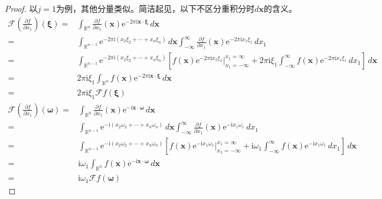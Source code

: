 \begin{proof}
    以$j=1$为例，其他分量类似。简洁起见，以下不区分重积分时$d\mathbf{x}$的含义。
    {\color{blue}\begin{align*}
    \mathcal{F} \left(\frac{\partial f}{\partial x_1}\right)(\boldsymbol{\xi})=&\int_{\mathbb{R}^n}\frac{\partial f}{\partial x_1}(\mathbf{x})\mathrm{e}^{-2\pi \mathrm{i} \mathbf{x}\cdot\boldsymbol{\xi}}\,d\mathbf{x}\\
    =&\int_{\mathbb{R}^{n-1}}\mathrm{e}^{-2\pi \mathrm{i} (x_2\xi_2+\cdots +x_n\xi_n)}\,d\mathbf{x}\int_{-\infty}^{\infty}\frac{\partial f}{\partial x_1}(\mathbf{x})\mathrm{e}^{-2\pi \mathrm{i} x_1 \xi_1}\,dx_1\\
    =&\int_{\mathbb{R}^{n-1}}\mathrm{e}^{-2\pi \mathrm{i} (x_2\xi_2+\cdots +x_n\xi_n)}\left[f(\mathbf{x})\mathrm{e}^{-2\pi \mathrm{i} x_1 \xi_1}\Big|_{x_1=-\infty}^{x_1=\infty}+2\pi \mathrm{i} \xi_1 \int_{-\infty}^{\infty}f(\mathbf{x})\mathrm{e}^{-2\pi \mathrm{i} x_1 \xi_1}\,dx_1\right]\,d\mathbf{x}\\
    =&2\pi \mathrm{i} \xi_1 \int_{\mathbb{R}^n}f(\mathbf{x})\mathrm{e}^{-2\pi \mathrm{i} \mathbf{x}\cdot\boldsymbol{\xi}}\,d\mathbf{x}\\
    =&2\pi \mathrm{i} \xi_1 \mathcal{F} f(\boldsymbol{\xi})
    \end{align*}}
    {\color{red}
    \begin{align*}
    \mathcal{F} \left(\frac{\partial f}{\partial x_1}\right)(\boldsymbol{\omega})=&\int_{\mathbb{R}^n}\frac{\partial f}{\partial x_1}(\mathbf{x})\mathrm{e}^{-\mathrm{i} \mathbf{x}\cdot\boldsymbol{\omega}}\,d\mathbf{x}\\
    =&\int_{\mathbb{R}^{n-1}}\mathrm{e}^{-\mathrm{i} (x_2\omega_2+\cdots +x_n\omega_n)}\,d\mathbf{x}\int_{-\infty}^{\infty}\frac{\partial f}{\partial x_1}(\mathbf{x})\mathrm{e}^{-\mathrm{i} x_1 \omega_1}\,dx_1\\
    =&\int_{\mathbb{R}^{n-1}}\mathrm{e}^{-\mathrm{i} (x_2\omega_2+\cdots +x_n\omega_n)}\left[f(\mathbf{x})\mathrm{e}^{-\mathrm{i} x_1 \omega_1}\Big|_{x_1=-\infty}^{x_1=\infty}+\mathrm{i} \omega_1 \int_{-\infty}^{\infty}f(\mathbf{x})\mathrm{e}^{-\mathrm{i} x_1 \omega_1}\,dx_1\right]\,d\mathbf{x}\\
    =&\mathrm{i} \omega_1 \int_{\mathbb{R}^n}f(\mathbf{x})\mathrm{e}^{-\mathrm{i} \mathbf{x}\cdot\boldsymbol{\omega}}\,d\mathbf{x}\\
    =&\mathrm{i} \omega_1 \mathcal{F} f(\boldsymbol{\omega})
    \end{align*}}
\end{proof}


